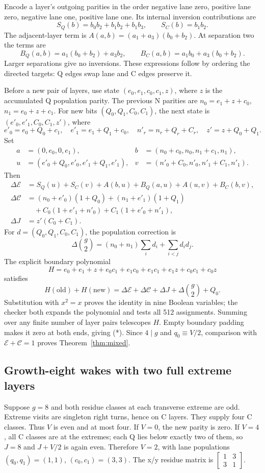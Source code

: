 Encode a layer's outgoing parities in the order negative lane zero,
positive lane zero, negative lane one, positive lane one. Its internal
inversion contributions are
\[
 S_Q(b)=b_0b_2+b_1b_2+b_1b_3,\qquad S_C(b)=b_1b_2.
\]
The adjacent-layer term is \(A(a,b)=(a_1+a_3)(b_0+b_2)\). At separation
two the terms are
\[
 B_Q(a,b)=a_1(b_0+b_2)+a_3b_2,\qquad
 B_C(a,b)=a_1b_0+a_3(b_0+b_2).
\]
Larger separations give no inversions. These expressions follow by ordering
the directed targets: Q edges swap lane and C edges preserve it.

Before a new pair of layers, use state \((e_0,e_1,c_0,c_1,z)\), where
\(z\) is the accumulated Q population parity. The previous N parities are
\(n_0=e_1+z+c_0\), \(n_1=e_0+z+c_1\). For new bits
\((Q_0,Q_1,C_0,C_1)\), the next state is
\((e'_0,e'_1,C_0,C_1,z')\), where
\[
 e'_0=e_0+Q_0+c_1,\quad e'_1=e_1+Q_1+c_0,\quad
 n'_r=n_r+Q_r+C_r,\quad z'=z+Q_0+Q_1.
\]
Set
\[
\begin{aligned}
 a&=(0,e_0,0,e_1),& b&=(n_0+c_0,n_0,n_1+c_1,n_1),\\
 u&=(e'_0+Q_0,e'_0,e'_1+Q_1,e'_1),&
 v&=(n'_0+C_0,n'_0,n'_1+C_1,n'_1).
\end{aligned}
\]
Then
\[
\begin{aligned}
 \Delta\mathcal E&=S_Q(u)+S_C(v)+A(b,u)+B_Q(a,u)+A(u,v)+B_C(b,v),\\
 \Delta\mathcal C&=(n_0+e'_0)(1+Q_0)+(n_1+e'_1)(1+Q_1)\\
 &\quad+C_0(1+e'_1+n'_0)+C_1(1+e'_0+n'_1),\\
 \Delta J&=z'(C_0+C_1).
\end{aligned}
\]
For \(d=(Q_0,Q_1,C_0,C_1)\), the population correction is
\[
 \Delta\binom g2=(n_0+n_1)\sum_i d_i+\sum_{i<j}d_id_j.
\]
The explicit boundary polynomial
\[
 H=e_0+e_1+z+e_0c_1+e_1c_0+e_1c_1+e_1z+c_0c_1+c_0z
\]
satisfies
\[
 H(\mathrm{old})+H(\mathrm{new})=
 \Delta\mathcal E+\Delta\mathcal C+\Delta J+
 \Delta\binom g2+Q_0.
\]
Substitution with \(x^2=x\) proves the identity in nine Boolean variables;
the checker both expands the polynomial and tests all 512 assignments.
Summing over any finite number of layer pairs telescopes \(H\). Empty
boundary padding makes it zero at both ends, giving (*). Since \(4\mid g\)
and \(q_0\equiv V/2\), comparison with
\(\mathcal E+\mathcal C=1\) proves Theorem~\ref{thm:mixed}.

\subsection{Growth-eight wakes with two full extreme layers}
Suppose \(g=8\) and both residue classes at each transverse extreme are odd.
Extreme visits are singleton right turns, hence on C layers. They supply four
C classes. Thus \(V\) is even and at most four. If \(V=0\), the new parity
is zero. If \(V=4\), all C classes are at the extremes; each Q lies below
exactly two of them, so \(J=8\) and \(J+V/2\) is again even. Therefore
\(V=2\), with lane populations \((q_0,q_1)=(1,1)\),
\((c_0,c_1)=(3,3)\). The x/y residue matrix is
\(\left[\begin{smallmatrix}1&3\\3&1\end{smallmatrix}\right]\).

